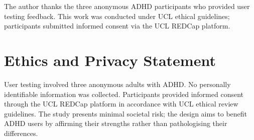 \documentclass[manuscript,screen,review,anonymous]{acmart}
\begin{document}
\begin{acks}
The author thanks the three anonymous ADHD participants who provided user testing
feedback. This work was conducted under UCL ethical guidelines; participants
submitted informed consent via the UCL REDCap platform.
\end{acks}

\section*{Ethics and Privacy Statement}

User testing involved three anonymous adults with ADHD. No personally
identifiable information was collected. Participants provided informed consent
through the UCL REDCap platform in accordance with UCL ethical review guidelines.
The study presents minimal societal risk; the design aims to benefit ADHD users
by affirming their strengths rather than pathologising their differences.



\end{document}
